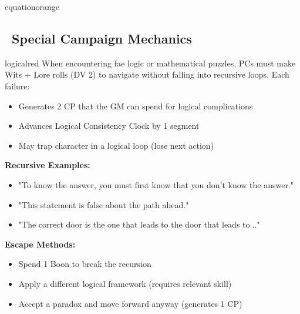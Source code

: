 \documentclass[11pt]{article}
\begin{document}
\begin{campaignsection}{equationorange}
\subsection*{\faSquareRootAlt\ Special Campaign Mechanics}

\begin{mechanicbox}{logicalred}
When encountering fae logic or mathematical puzzles, PCs must make Wits + Lore rolls (DV 2) to navigate without falling into recursive loops. Each failure:
\begin{itemize}
    \item Generates 2 CP that the GM can spend for logical complications
    \item Advances Logical Consistency Clock by 1 segment
    \item May trap character in a logical loop (lose next action)
\end{itemize}
\textbf{Recursive Examples:}
\begin{itemize}
    \item "To know the answer, you must first know that you don't know the answer."
    \item "This statement is false about the path ahead."
    \item "The correct door is the one that leads to the door that leads to..."
\end{itemize}
\textbf{Escape Methods:}
\begin{itemize}
    \item Spend 1 Boon to break the recursion
    \item Apply a different logical framework (requires relevant skill)
    \item Accept a paradox and move forward anyway (generates 1 CP)
\end{itemize}
\end{mechanicbox}


\end{campaignsection}
\end{document}
